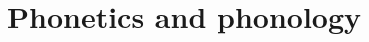 \documentclass[output=book,modfonts,nonflat,collection,collectionchapter,multiauthors
		  ]{langsci/langscibook}
\begin{document}
         
\newcommand{\lsCollectionPaperFirstPage}{1}
\newcommand{\lsCollectionPaperLastPage}{1}
\maketitle                
\frontmatter 
{} %
\tableofcontents
 
\mainmatter          
 
\renewcommand{\lsChapterFooterSize}{\footnotesize}
\part{Phonetics and phonology}
% 
% 
% 
% 
% 
%  
\sloppy
 
\end{document}
